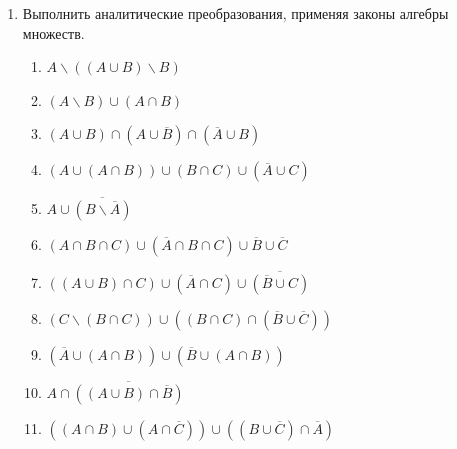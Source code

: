 \begin{enumerate}
    \item Выполнить аналитические преобразования, применяя законы алгебры множеств.
    \begin{enumerate}
        \item $A\backslash((A\cup B)\backslash B)$
        \item $(A\backslash B)\cup(A\cap B)$
        \item $(A\cup B)\cap(A\cup\overline{B})\cap(\overline{A}\cup B)$
        \item $(A\cup (A\cap B))\cup(B\cap C)\cup(\overline{A}\cup C)$
        \item $A\cup\overline{(B\backslash\overline{A})}$
        \item $(A\cap B\cap C)\cup(\overline{A}\cap B\cap C)\cup\overline{B}\cup\overline{C}$
        \item $((A\cup B)\cap C)\cup(\overline{A}\cap C)\cup\overline{(\overline{B}\cup C)}$
        \item $(C\backslash(B\cap C))\cup((B\cap C)\cap(\overline{B}\cup\overline{C}))$
        \item $(\overline{A}\cup(A\cap B))\cup(\overline{B}\cup(A\cap B))$
        \item $A\cap\overline{((A\cup B)\cap\overline{B})}$
        \item $((A\cap B)\cup(A\cap\overline{C}))\cup((B\cup\overline{C})\cap\overline{A})$
    \end{enumerate}
\end{enumerate}
